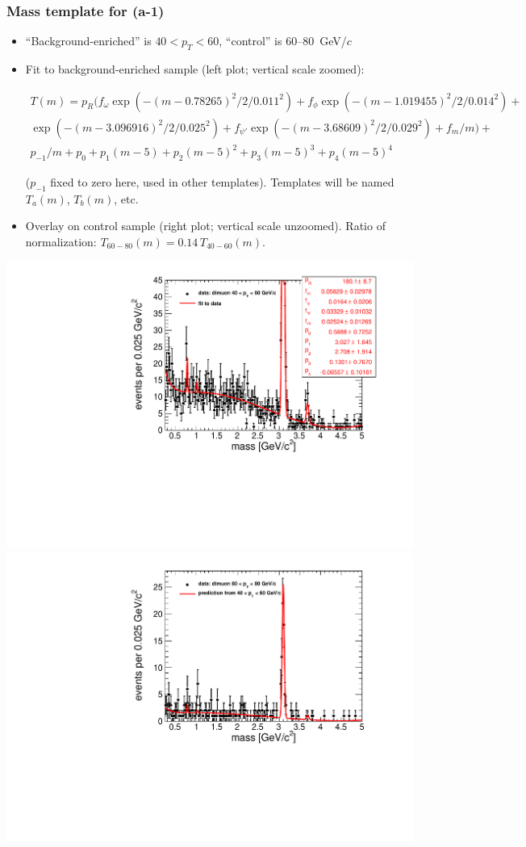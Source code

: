 \documentclass[compress]{beamer}
\begin{document}
\begin{frame}
\frametitle{Mass template for (a-1)}

\begin{itemize}
\item ``Background-enriched'' is $40 < p_T < 60$, ``control'' is 60--80~GeV/$c$
\item Fit to background-enriched sample (left plot; vertical scale zoomed):

\vspace{-0.5 cm}
{\tiny
\begin{multline}
T(m) = p_R(f_\omega \exp(-(m-0.78265)^2 / 2 / 0.011^2) + f_\phi \exp(-(m-1.019455)^2 / 2 / 0.014^2) + \\
\exp(-(m-3.096916)^2 / 2 / 0.025^2) + f_{\psi'} \exp(-(m-3.68609)^2 / 2 / 0.029^2) + f_m/m) + \\
p_{-1}/m + p_0 + p_1 (m-5) + p_2 (m-5)^2 + p_3 (m-5)^3 + p_4 (m-5)^4
\label{eqn:mass_template}
\end{multline}

\vspace{-0.5 cm}
($p_{-1}$ fixed to zero here, used in other templates).  Templates will be named $T_a(m)$, $T_b(m)$, etc.}

\item Overlay on control sample (right plot; vertical scale unzoomed).
  Ratio of normalization: $T_{60-80}(m) = 0.14 \, T_{40-60}(m)$.
\end{itemize}

\includegraphics[width=0.5\linewidth]{backgroundEnriched_highpt.pdf}
\includegraphics[width=0.5\linewidth]{control_highpt.pdf}
\end{frame}
\end{document}
